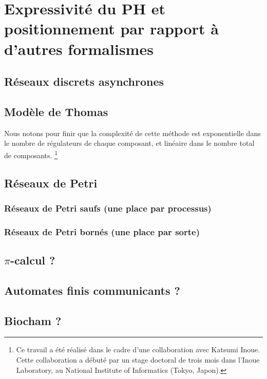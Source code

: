 
\chapter{Expressivité du PH et positionnement par rapport à d'autres formalismes}

\section{Réseaux discrets asynchrones}


\section{Modèle de Thomas}
Nous notons pour finir que la complexité de cette méthode est exponentielle dans le nombre
de régulateurs de chaque composant, et linéaire dans le nombre total de composants.
\footnote{Ce travail a été réalisé dans le cadre d'une collaboration avec Katsumi Inoue.
Cette collaboration a débuté par un stage doctoral de trois mois dans l'Inoue Laboratory,
au National Institute of Informatics (Tokyo, Japon).}

\section{Réseaux de Petri}
  \subsection{Réseaux de Petri saufs (une place par processus)}
  \subsection{Réseaux de Petri bornés (une place par sorte)}

\section{$\pi$-calcul ?}

\section{Automates finis communicants ?}

\section{Biocham ?}
